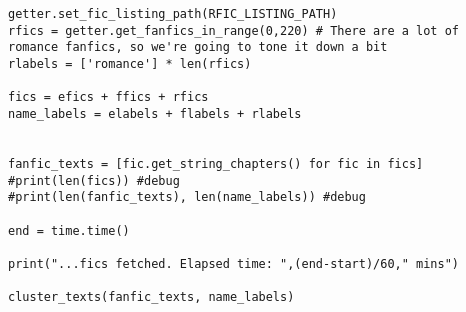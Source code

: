 \documentclass{pre-tfg}
\begin{document}
\begin{lstlisting}[style=consola]
getter.set_fic_listing_path(RFIC_LISTING_PATH)
rfics = getter.get_fanfics_in_range(0,220) # There are a lot of romance fanfics, so we're going to tone it down a bit
rlabels = ['romance'] * len(rfics)

fics = efics + ffics + rfics
name_labels = elabels + flabels + rlabels


fanfic_texts = [fic.get_string_chapters() for fic in fics]
#print(len(fics)) #debug
#print(len(fanfic_texts), len(name_labels)) #debug

end = time.time()

print("...fics fetched. Elapsed time: ",(end-start)/60," mins")

cluster_texts(fanfic_texts, name_labels)


\end{lstlisting}

\cleardoublepage
\end{document}

